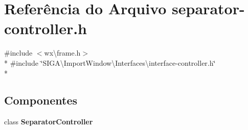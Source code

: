 \section{Referência do Arquivo separator-\/controller.h}
\label{separator-controller_8h}
{\ttfamily \#include $<$wx\textbackslash{}frame.\+h$>$}\\*
{\ttfamily \#include \char`\"{}S\+I\+G\+A\textbackslash{}\+Import\+Window\textbackslash{}\+Interfaces\textbackslash{}interface-\/controller.\+h\char`\"{}}\\*
\subsection*{Componentes}
\begin{DoxyCompactItemize}
\item 
class {\bf Separator\+Controller}
\end{DoxyCompactItemize}

